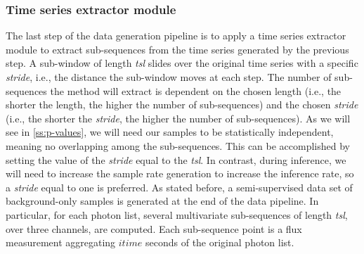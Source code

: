 \subsubsection{Time series extractor module}
\label{ss:extractor}
The last step of the data generation pipeline is to apply a time series extractor module to extract sub-sequences from the time series generated by the previous step. A sub-window of length \textit{tsl} slides over the original time series with a specific \textit{stride}, i.e., the distance the sub-window moves at each step. The number of sub-sequences the method will extract is dependent on the chosen length (i.e., the shorter the length, the higher the number of sub-sequences) and the chosen \textit{stride} (i.e., the shorter the \textit{stride}, the higher the number of sub-sequences). As we will see in \autoref{ss:p-values}, we will need our samples to be statistically independent, meaning no overlapping among the sub-sequences. This can be accomplished by setting the value of the \textit{stride} equal to the \textit{tsl}. In contrast, during inference, we will need to increase the sample rate generation to increase the inference rate, so a \textit{stride} equal to one is preferred. As stated before, a semi-supervised data set of background-only samples is generated at the end of the data pipeline. In particular, for each photon list, several multivariate sub-sequences of length \textit{tsl}, over three channels, are computed. Each sub-sequence point is a flux measurement aggregating $itime$ seconds of the original photon list.  


